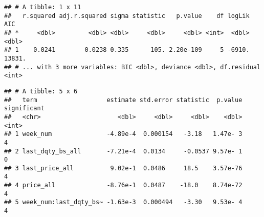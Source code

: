 \documentclass[]{article}
\newenvironment{Shaded}{\begin{snugshade}}{\end{snugshade}}
\newcommand{\KeywordTok}[1]{\textcolor[rgb]{0.13,0.29,0.53}{\textbf{#1}}}
\newcommand{\DataTypeTok}[1]{\textcolor[rgb]{0.13,0.29,0.53}{#1}}
\newcommand{\DecValTok}[1]{\textcolor[rgb]{0.00,0.00,0.81}{#1}}
\newcommand{\FloatTok}[1]{\textcolor[rgb]{0.00,0.00,0.81}{#1}}
\newcommand{\StringTok}[1]{\textcolor[rgb]{0.31,0.60,0.02}{#1}}
\newcommand{\OperatorTok}[1]{\textcolor[rgb]{0.81,0.36,0.00}{\textbf{#1}}}
\newcommand{\NormalTok}[1]{#1}
\begin{document}
\begin{Shaded}
\end{Shaded}

\begin{verbatim}
## # A tibble: 1 x 11
##   r.squared adj.r.squared sigma statistic   p.value    df logLik    AIC
## *     <dbl>         <dbl> <dbl>     <dbl>     <dbl> <int>  <dbl>  <dbl>
## 1    0.0241        0.0238 0.335      105. 2.20e-109     5 -6910. 13831.
## # ... with 3 more variables: BIC <dbl>, deviance <dbl>, df.residual <int>
\end{verbatim}

\begin{Shaded}
\end{Shaded}

\begin{verbatim}
## # A tibble: 5 x 6
##   term                   estimate std.error statistic  p.value significant
##   <chr>                     <dbl>     <dbl>     <dbl>    <dbl>       <int>
## 1 week_num               -4.89e-4  0.000154   -3.18   1.47e- 3           4
## 2 last_dqty_bs_all       -7.21e-4  0.0134     -0.0537 9.57e- 1           0
## 3 last_price_all          9.02e-1  0.0486     18.5    3.57e-76           4
## 4 price_all              -8.76e-1  0.0487    -18.0    8.74e-72           4
## 5 week_num:last_dqty_bs~ -1.63e-3  0.000494   -3.30   9.53e- 4           4
\end{verbatim}
\end{document}
